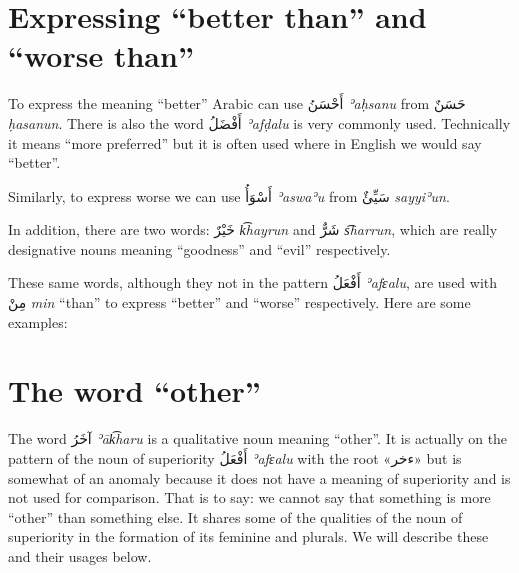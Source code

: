 \documentclass[
  10pt,
]{book}
\begin{document}
\section{\texorpdfstring{Expressing \enquote{better than} and \enquote{worse than}}{Expressing ``better than'' and ``worse than''}}\label{expressing-better-than-and-worse-than}

To express the meaning \enquote{better} Arabic can use \foreignlanguage{arabic}{أَحْسَنُ} \emph{ʾaḥsanu} from \foreignlanguage{arabic}{حَسَنٌ} \emph{ḥasanun}. There is also the word \foreignlanguage{arabic}{أَفْضَلُ} \emph{ʾafḍalu} is very commonly used. Technically it means \enquote{more preferred} but it is often used where in English we would say \enquote{better}.

Similarly, to express worse we can use \foreignlanguage{arabic}{أَسْوَأُ} \emph{ʾaswaʾu} from \foreignlanguage{arabic}{سَيِّئٌ} \emph{sayyiʾun}.

In addition, there are two words: \foreignlanguage{arabic}{خَيْرٌ} \emph{k͡hayrun} and \foreignlanguage{arabic}{شَرٌّ} \emph{s͡harrun}, which are really designative nouns meaning \enquote{goodness} and \enquote{evil} respectively.

These same words, although they not in the pattern \foreignlanguage{arabic}{أَفْعَلُ} \emph{ʾafɛalu}, are used with \foreignlanguage{arabic}{مِنْ} \emph{min} \enquote{than} to express \enquote{better} and \enquote{worse} respectively. Here are some examples:

\section{\texorpdfstring{The word \enquote{other}}{The word ``other''}}\label{the-word-other}

The word \foreignlanguage{arabic}{آخَرُ} \emph{ʾāk͡haru} is a qualitative noun meaning \enquote{other}. It is actually on the pattern of the noun of superiority \foreignlanguage{arabic}{أَفْعَلُ} \emph{ʾafɛalu} with the root \foreignlanguage{arabic}{«ءخر»} but is somewhat of an anomaly because it does not have a meaning of superiority and is not used for comparison. That is to say: we cannot say that something is more \enquote{other} than something else. It shares some of the qualities of the noun of superiority in the formation of its feminine and plurals. We will describe these and their usages below.
\end{document}
